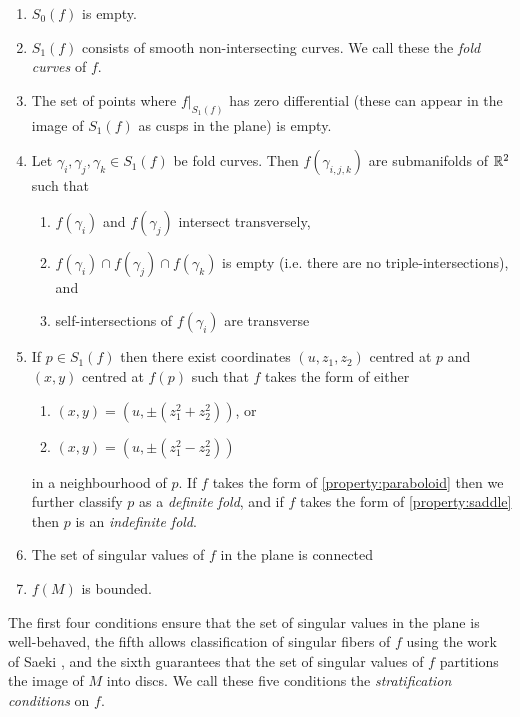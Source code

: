 \begin{enumerate}
	\item $S_0(f)$ is empty.
	
	\item $S_1(f)$ consists of smooth non-intersecting curves.  We call these the \emph{fold curves} of $f$.
	
	\item The set of points where $f|_{S_1(f)}$ has zero differential (these can appear in the image of $S_1(f)$ as cusps in the plane) is empty.
	
	\item Let $\gamma_i, \gamma_j, \gamma_k \in S_1(f)$ be fold curves. Then $f(\gamma_{i,j,k})$ are submanifolds of $\mathbb{R}^2$ such that
	\begin{enumerate}
		\item $f(\gamma_i)$ and $f(\gamma_j)$ intersect transversely,
		
		\item $f(\gamma_i)\cap f(\gamma_j)\cap f(\gamma_k)$ is empty (i.e. there are no triple-intersections), and
		
		\item self-intersections of $f(\gamma_i)$ are transverse
	\end{enumerate}
	
	\item\label{strat-con:fold-type} If $p\in S_1(f)$ then there exist coordinates $(u, z_1, z_2)$ centred at $p$ and $(x,y)$ centred at $f(p)$ such that $f$ takes the form of either
	\begin{enumerate}
		\item\label{property:paraboloid} $(x,y)=(u,\pm(z_1^2+z_2^2))$, or
		\item\label{property:saddle} $(x,y)=(u,\pm(z_1^2-z_2^2))$
	\end{enumerate}
	in a neighbourhood of $p$.
	If $f$ takes the form of \ref{property:paraboloid} then we further classify $p$ as a \emph{definite fold}, and if $f$ takes the form of \ref{property:saddle} then $p$ is an \emph{indefinite fold}.
	
	\item The set of singular values of $f$ in the plane is connected
	
	\item $f(M)$ is bounded.
\end{enumerate}

The first four conditions ensure that the set of singular values in the plane is well-behaved, the fifth allows classification of singular fibers of $f$ using the work of Saeki \cite{Saeki}, and the sixth guarantees that the set of singular values of $f$ partitions the image of $M$ into discs.
We call these five conditions the \emph{stratification conditions} on $f$.